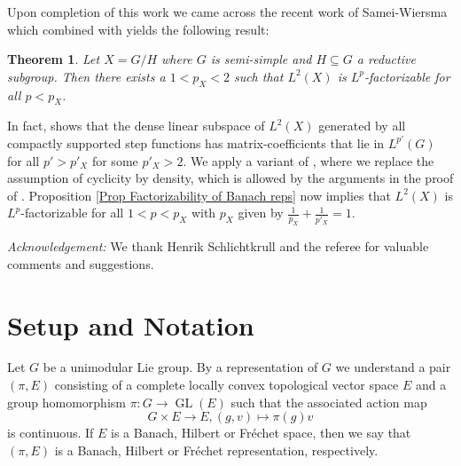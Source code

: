 \documentclass[12pt,letterpaper,titlepage,reqno]{amsart}
\theoremstyle{plain}
\newtheorem{theorem}{Theorem}[section]
\theoremstyle{definition}
\numberwithin{equation}{section}
\newcommand{\GL}{\operatorname{GL}}
\begin{document}
Upon completion of this work we came across the recent work of Samei-Wiersma \cite{SW} which combined with \cite{BK} yields the following result:

\begin{theorem}
Let $X=G/H$ where $G$ is semi-simple and $H\subseteq G$ a reductive subgroup.  Then there exists a $1<p_{X}<2$ such that $L^{2}(X)$ is $L^{p}$-factorizable for all $p<p_{X}$.
\end{theorem}

In fact, \cite[Lemma 2.8]{BK} shows that the dense linear subspace of $L^{2}(X)$ generated by all compactly supported step functions has matrix-coefficients that lie in $L^{p'}(G)$ for all $p'>p'_{X}$ for some $p'_{X}>2$. We apply a variant of \cite[Theorem 1.5]{SW}, where we replace the assumption of cyclicity by density, which is allowed by the arguments in the proof of \cite[Corollary 5.5]{SW}. Proposition \ref{Prop Factorizability of Banach reps} now implies that $L^{2}(X)$ is $L^{p}$-factorizable for all $1<p<p_{X}$ with $p_{X}$ given by $\frac{1}{p_{X}}+\frac{1}{p'_{X}}=1$.

{\em Acknowledgement:} We thank Henrik Schlichtkrull and the referee for valuable comments and suggestions.

\section{Setup and Notation}
Let $G$ be a unimodular Lie group. By a representation of $G$ we understand a pair $(\pi, E)$ consisting of a complete locally convex topological vector space $E$ and a group homomorphism $\pi: G\rightarrow \GL(E)$ such that the associated action map
$$
G\times E \rightarrow E, (g,v)\mapsto \pi(g)v
$$
is continuous. If $E$ is a Banach, Hilbert or Fr\'echet space, then we say that $(\pi, E)$ is  a Banach, Hilbert or Fr\'echet representation, respectively.
\end{document}
